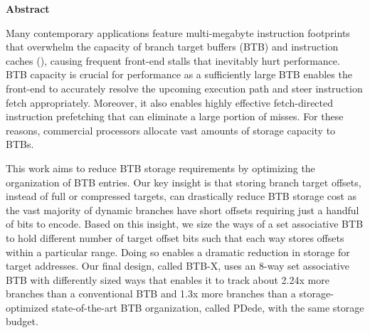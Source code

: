 \documentclass[../../../main.tex]{subfiles}
\begin{document}
\begin{center}
  \textbf{Abstract}
  \end{center}
\begin{changemargin}{0.75cm}{0.75cm}
Many contemporary applications feature multi-megabyte instruction footprints that overwhelm the capacity of branch target buffers (BTB) and instruction caches (), causing frequent front-end stalls that inevitably hurt performance. BTB capacity is crucial for performance as a sufficiently large BTB enables the front-end to accurately resolve the upcoming execution path and steer instruction fetch appropriately. Moreover, it also enables highly effective fetch-directed instruction prefetching that can eliminate a large portion of  misses. For these reasons, commercial processors allocate vast amounts of storage capacity to BTBs.

This work aims to reduce BTB storage requirements by optimizing the organization of BTB entries. Our key insight is that storing branch target offsets, instead of full or compressed targets, can drastically reduce BTB storage cost as the vast majority of dynamic branches have short offsets requiring just a handful of bits to encode. Based on this insight, we size the ways of a set associative BTB to hold different number of target offset bits such that each way stores offsets within a particular range. Doing so enables a dramatic reduction in storage for target addresses. Our final design, called BTB-X, uses an 8-way set associative BTB with differently sized ways that enables it to track about 2.24x more branches than a conventional BTB and 1.3x more branches than a storage-optimized state-of-the-art BTB organization, called PDede, with the same storage budget.
\end{changemargin}

\vspace{1cm}

\begin{refsection}
  
  \printbibliography[heading=refs]

  \begin{subappendices}
    
  \end{subappendices}

\end{refsection}
\FloatBarrier
\end{document}
